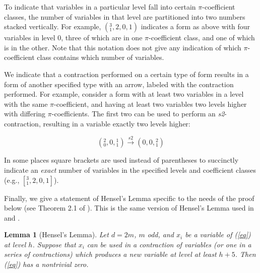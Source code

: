 \documentclass[12pt]{amsart}
\newtheorem{lemma}{Lemma}
\begin{document}
To indicate that variables in a particular level fall into certain $\pi$-coefficient classes, the number of variables in that level are partitioned into two numbers stacked vertically.  For example, $(^3_1, 2, 0, 1)$ indicates a form as above with four variables in level 0, three of which are in one $\pi$-coefficient class, and one of which is in the other.  Note that this notation does not give any indication of which $\pi$-coefficient class contains which number of variables.

We indicate that a contraction performed on a certain type of form results in a form of another specified type with an arrow, labeled with the contraction performed.  For example, consider a form with at least two variables in a level with the same $\pi$-coefficient, and having at least two variables two levels higher with differing $\pi$-coefficients.  The first two can be used to perform an \textit{s2}-contraction, resulting in a variable exactly two levels higher:

$$({}^{2}_{0}, 0, {}^{1}_{1}) \xrightarrow{s2} (0, 0, {}^{2}_{1})$$

In some places square brackets are used instead of parentheses to succinctly indicate an \textit{exact} number of variables in the specified levels and coefficient classes (e.g., $[^3_1, 2, 0, 1]$).

Finally, we give a statement of Hensel's Lemma specific to the needs of the proof below (see Theorem 2.1 of \cite{leep2018diagonal}).  This is the same version of Hensel's Lemma used in \cite{knapp2016solubility} and \cite{2020arXiv200509770D}.


\begin{lemma}[Hensel's Lemma]
Let $d=2m$, $m$ odd, and $x_i$ be a variable of (\ref{eq}) at level $h$.  Suppose that $x_i$ can be used in a contraction of variables (or one in a series of contractions) which produces a new variable at level at least $h+5$.  Then (\ref{eq}) has a nontrivial zero.
\end{lemma}
\end{document}
